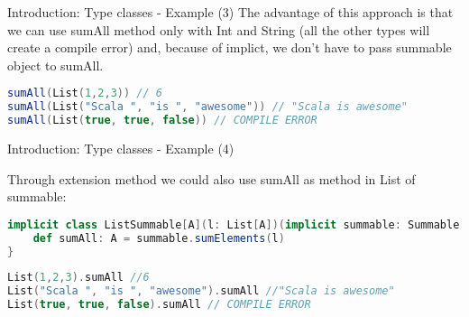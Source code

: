 \begin{frame}[fragile]{Introduction: Type classes - Example (3)}
	The advantage of this approach is that we can use sumAll method only with Int and String (all the other types will create 
	a compile error) and, because of implict, we don't have to pass summable object to sumAll.
	
\begin{lstlisting}[language=scala]
sumAll(List(1,2,3)) // 6
sumAll(List("Scala ", "is ", "awesome")) // "Scala is awesome"
sumAll(List(true, true, false)) // COMPILE ERROR				
\end{lstlisting}

\end{frame}
	
\begin{frame}[fragile]{Introduction: Type classes - Example (4)}
	
	Through extension method we could also use sumAll as method in List of summable:
\begin{lstlisting}[language=scala]
implicit class ListSummable[A](l: List[A])(implicit summable: Summable[A]) {
	def sumAll: A = summable.sumElements(l)
}
\end{lstlisting}	
	
	\pause
	
\begin{lstlisting}[language=scala]
List(1,2,3).sumAll //6
List("Scala ", "is ", "awesome").sumAll //"Scala is awesome"
List(true, true, false).sumAll // COMPILE ERROR
\end{lstlisting}
\end{frame}